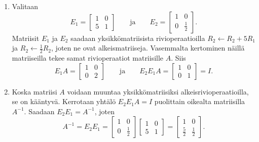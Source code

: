 \documentclass[11pt,a4paper]{amsart}
\begin{document}
\begin{solution}
  \leavevmode\par
  \begin{enumerate}[label=(\alph*), leftmargin=*]
    \item Valitaan
      \[
        E_1 =
        \begin{bmatrix}
          1 & 0 \\
          5 & 1
        \end{bmatrix}
        \qquad\text{ja}\qquad
        E_2 =
        \begin{bmatrix}
          1 & 0 \\
          0 & \frac12
        \end{bmatrix}.
      \]
      Matriisit \(E_1\) ja \(E_2\) saadaan yksikkömatriisista
      rivioperaatioilla \(R_2 \leftarrow R_2+5R_1\) ja
      \(R_2 \leftarrow \frac12 R_2\), joten ne ovat alkeismatriiseja.
      Vasemmalta kertominen näillä matriiseilla tekee samat
      rivioperaatiot matriisille \(A\). Siis
      \[
        E_1A =
        \begin{bmatrix}
          1 & 0 \\
          0 & 2
        \end{bmatrix}
        \qquad\text{ja}\qquad
        E_2E_1A =
        \begin{bmatrix}
          1 & 0 \\
          0 & 1
        \end{bmatrix}
        = I.
      \]

    \item Koska matriisi \(A\) voidaan muuntaa yksikkömatriisiksi
      alkeisrivioperaatioilla, se on kääntyvä. Kerrotaan yhtälö
      \(E_2E_1A=I\) puolittain oikealta matriisilla \(A^{-1}\).
      Saadaan \(E_2E_1=A^{-1}\), joten
      \[
        A^{-1} = E_2E_1 =
        \begin{bmatrix}
          1 & 0 \\
          0 & \frac12
        \end{bmatrix}
        \begin{bmatrix}
          1 & 0 \\
          5 & 1
        \end{bmatrix}
        =
        \begin{bmatrix}
          1 & 0 \\
          \frac52 & \frac12
        \end{bmatrix}.
      \]


\end{enumerate}
\end{solution}
\end{document}
